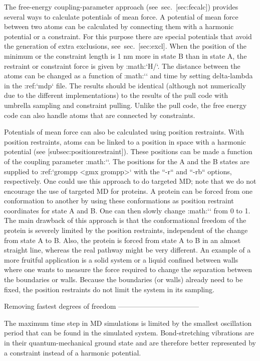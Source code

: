 The free-energy coupling-parameter approach (see sec. [sec:fecalc])
provides several ways to calculate potentials of mean force. A potential
of mean force between two atoms can be calculated by connecting them
with a harmonic potential or a constraint. For this purpose there are
special potentials that avoid the generation of extra exclusions,
see sec. [sec:excl]. When the position of the minimum or the constraint
length is 1 nm more in state B than in state A, the restraint or
constraint force is given by :math:`\partial H/\partial \lambda`. The
distance between the atoms can be changed as a function of
:math:`\lambda` and time by setting delta-lambda in the :ref:`mdp` file. The
results should be identical (although not numerically due to the
different implementations) to the results of the pull code with umbrella
sampling and constraint pulling. Unlike the pull code, the free energy
code can also handle atoms that are connected by constraints.

Potentials of mean force can also be calculated using position
restraints. With position restraints, atoms can be linked to a position
in space with a harmonic potential (see [subsec:positionrestraint]).
These positions can be made a function of the coupling parameter
:math:`\lambda`. The positions for the A and the B states are supplied
to :ref:`grompp <gmx grompp>` with the ``-r`` and ``-rb`` options, respectively. One could use this
approach to do targeted MD; note that we do not encourage the use of
targeted MD for proteins. A protein can be forced from one conformation
to another by using these conformations as position restraint
coordinates for state A and B. One can then slowly change
:math:`\lambda` from 0 to 1. The main drawback of this approach is that
the conformational freedom of the protein is severely limited by the
position restraints, independent of the change from state A to B. Also,
the protein is forced from state A to B in an almost straight line,
whereas the real pathway might be very different. An example of a more
fruitful application is a solid system or a liquid confined between
walls where one wants to measure the force required to change the
separation between the boundaries or walls. Because the boundaries (or
walls) already need to be fixed, the position restraints do not limit
the system in its sampling.

Removing fastest degrees of freedom
-----------------------------------

The maximum time step in MD simulations is limited by the smallest
oscillation period that can be found in the simulated system.
Bond-stretching vibrations are in their quantum-mechanical ground state
and are therefore better represented by a constraint instead of a
harmonic potential.

